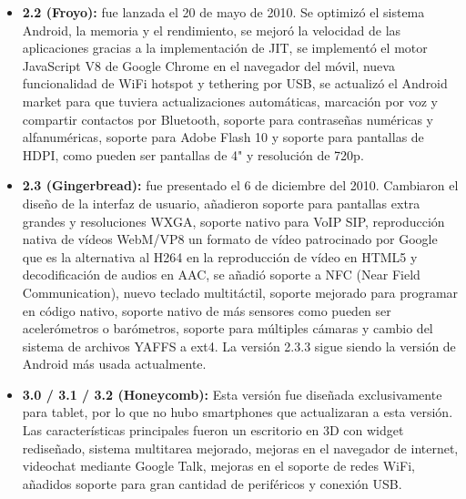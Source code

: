 \begin{itemize}
	\item \textbf{2.2 (Froyo):} fue lanzada el 20 de mayo de 2010. Se optimizó el sistema Android, la memoria y el rendimiento, se mejoró la velocidad de las aplicaciones gracias a la implementación de JIT, se implementó el motor JavaScript V8 de Google Chrome en el navegador del móvil, nueva funcionalidad de WiFi hotspot y tethering por USB, se actualizó el Android market para que tuviera actualizaciones automáticas, marcación por voz y compartir contactos por Bluetooth, soporte para contraseñas numéricas y alfanuméricas, soporte para Adobe Flash 10 y soporte para pantallas de HDPI, como pueden ser pantallas de 4" y resolución de 720p. 

	\item \textbf{2.3 (Gingerbread):} fue presentado el 6 de diciembre del 2010. Cambiaron el diseño de la interfaz de usuario, añadieron soporte para pantallas extra grandes y resoluciones WXGA, soporte nativo para VoIP SIP, reproducción nativa de vídeos WebM/VP8 un formato de vídeo patrocinado por Google que es la alternativa al H264 en la reproducción de vídeo en HTML5 y decodificación de audios en AAC, se añadió soporte a NFC (Near Field Communication), nuevo teclado multitáctil, soporte mejorado para programar en código nativo, soporte nativo de más sensores como pueden ser acelerómetros o barómetros, soporte para múltiples cámaras y cambio del sistema de archivos YAFFS a ext4. La versión 2.3.3 sigue siendo la versión de Android más usada actualmente. 

	\item \textbf{3.0 / 3.1 / 3.2 (Honeycomb):} Esta versión fue diseñada exclusivamente para tablet, por lo que no hubo smartphones que actualizaran a esta versión. Las características principales fueron un escritorio en 3D con widget rediseñado, sistema multitarea mejorado, mejoras en el navegador de internet, videochat mediante Google Talk, mejoras en el soporte de redes WiFi, añadidos soporte para gran cantidad de periféricos y conexión USB.
	

\end{itemize}
